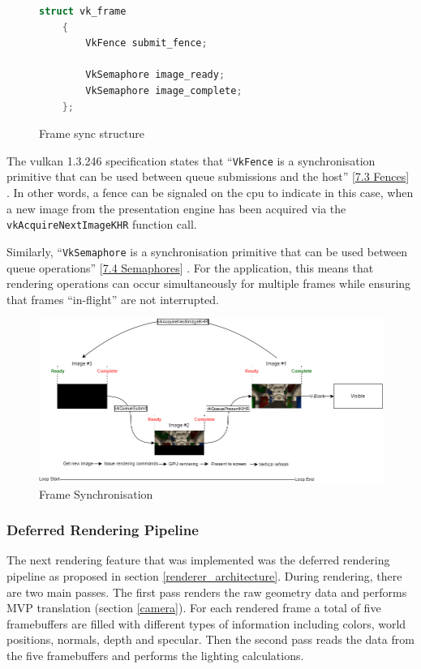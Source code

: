 \documentclass[11pt]{article}
\begin{document}
\begin{figure}[H]
  \centering
  \begin{lstlisting}[language=C++]
    struct vk_frame
    {
        VkFence submit_fence;

        VkSemaphore image_ready;
        VkSemaphore image_complete;
    };
  \end{lstlisting}
  \caption{Frame sync structure}
  \label{fig:vk_fence}
\end{figure}

The \gls*{vulkan} 1.3.246 specification states that  ``\lstinline{VkFence} is a
synchronisation primitive that can be used between queue submissions and the
host''
[\href{https://registry.khronos.org/vulkan/specs/1.3-extensions/man/html/VkFence.html}{7.3
Fences}] \cite{vulkan-spec}. In other words, a fence can be signaled on the
\gls*{cpu} to indicate in this case, when a new image from the presentation
engine has been acquired via the \lstinline{vkAcquireNextImageKHR} function
call.

Similarly, ``\lstinline{VkSemaphore} is a synchronisation primitive that can be
used between queue operations''
[\href{https://registry.khronos.org/vulkan/specs/1.3-extensions/man/html/VkSemaphore.html}{7.4
Semaphores}] \cite{vulkan-spec}. For the application, this means that rendering
operations can occur simultaneously for multiple frames while ensuring that
frames ``in-flight'' are not interrupted.

\begin{figure}[H]
  \centering
  \includegraphics[width=\textwidth]{images/frame_sync.png}
  \caption{Frame Synchronisation}
  \label{fig:frame_sync}
\end{figure}

\subsubsection{Deferred Rendering Pipeline}
The next rendering feature that was implemented was the deferred rendering
pipeline as proposed in section \ref{renderer_architecture}. During rendering,
there are two main passes. The first pass renders the raw geometry data and
performs MVP translation (section \ref{camera}). For each rendered frame a total
of five framebuffers are filled with different types of information including
colors, world positions, normals, depth and specular. Then the second pass reads
the data from the five framebuffers and performs the lighting calculations. 
\end{document}
